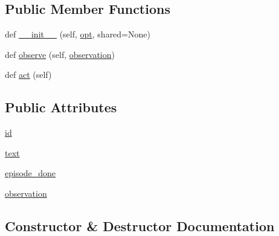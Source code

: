 \subsection*{Public Member Functions}
\begin{DoxyCompactItemize}
\item 
def \hyperlink{classprojects_1_1convai_1_1convai__bot_1_1ConvAISampleAgent_aeda4b425435529ee707d94da833efd2a}{\+\_\+\+\_\+init\+\_\+\+\_\+} (self, \hyperlink{classparlai_1_1core_1_1agents_1_1Agent_ab3b45d2754244608c75d4068b90cd051}{opt}, shared=None)
\item 
def \hyperlink{classprojects_1_1convai_1_1convai__bot_1_1ConvAISampleAgent_ae5914332a263728f39f20dbc3ad749b7}{observe} (self, \hyperlink{classprojects_1_1convai_1_1convai__bot_1_1ConvAISampleAgent_aacf7a75b2dca2c7a1fd71bd59eb238fc}{observation})
\item 
def \hyperlink{classprojects_1_1convai_1_1convai__bot_1_1ConvAISampleAgent_a7eec937e205e191f690adcc742bdb87c}{act} (self)
\end{DoxyCompactItemize}
\subsection*{Public Attributes}
\begin{DoxyCompactItemize}
\item 
\hyperlink{classprojects_1_1convai_1_1convai__bot_1_1ConvAISampleAgent_a0f54fd203c224b271ee65099363ac45d}{id}
\item 
\hyperlink{classprojects_1_1convai_1_1convai__bot_1_1ConvAISampleAgent_ad572c88a70e57a35bbb088c98af7860e}{text}
\item 
\hyperlink{classprojects_1_1convai_1_1convai__bot_1_1ConvAISampleAgent_a8bdf2e2fcc4defb29becfd02e23f058e}{episode\+\_\+done}
\item 
\hyperlink{classprojects_1_1convai_1_1convai__bot_1_1ConvAISampleAgent_aacf7a75b2dca2c7a1fd71bd59eb238fc}{observation}
\end{DoxyCompactItemize}


\subsection{Constructor \& Destructor Documentation}
\mbox{\label{classprojects_1_1convai_1_1convai__bot_1_1ConvAISampleAgent_aeda4b425435529ee707d94da833efd2a}} 
